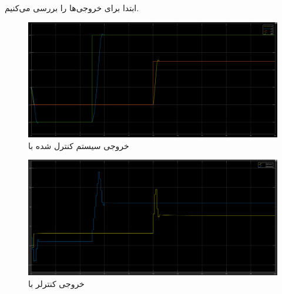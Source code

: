 \documentclass[14pt, a4paper]{extarticle}
\begin{document}
\subsubsection{}
ابتدا برای 
خروجی‌ها را بررسی می‌کنیم.\\
\begin{figure}[h!]
	\centering
	\includegraphics[scale = 0.3]{Q2_sim_result_ch5.png}
	\caption{خروجی سیستم کنترل شده با
		}
\end{figure}
\begin{figure}[h!]
	\centering
	\includegraphics[scale = 0.3]{Q2_sim_control_ch5.png}
	\caption{خروجی کنترلر با
		}
\end{figure}
\end{document}
